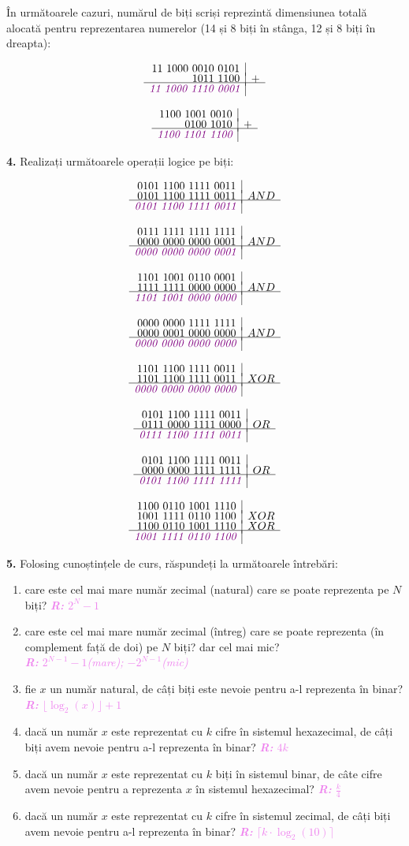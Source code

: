 \documentclass[a4paper]{article}
\newcommand{\hl}[1]{\textcolor{violet}{\textit{#1}}}
\newcommand{\binarysum}[3]{%
    \[
    \begin{array}{r|l}
    \text{#1} \\[-3pt]
    \text{#2} & + \\[-3pt]
    \hline
    \hl{#3} \\
    \end{array}
    \]
}
\newcommand{\binaryand}[3]{%
    \[
    \begin{array}{r|l}
    \text{#1} \\[-3pt]
    \text{#2} & AND \\[-3pt]
    \hline
    \hl{#3} \\
    \end{array}
    \]
}
\newcommand{\binaryor}[3]{%
    \[
    \begin{array}{r|l}
    \text{#1} \\[-3pt]
    \text{#2} & OR \\[-3pt]
    \hline
    \hl{#3} \\
    \end{array}
    \]
}
\newcommand{\binaryxor}[3]{%
    \[
    \begin{array}{r|l}
    \text{#1} \\[-3pt]
    \text{#2} & XOR \\[-3pt]
    \hline
    \hl{#3} \\
    \end{array}
    \]
}
\newcommand{\doublebinaryxor}[4]{%
    \begingroup\obeyspaces
    \[
    \begin{array}{r|l}
    \text{#1} \\[-3pt]
    \text{#2} & XOR \\[-3pt]
    \text{#3} & XOR \\[-3pt]
    \hline
    \hl{#4} \\
    \end{array}
    \]
    \endgroup
}
\begin{document}
În următoarele cazuri, numărul de biți scriși reprezintă dimensiunea totală alocată pentru reprezentarea numerelor (14 și 8 biți în stânga, 12 și 8 biți în dreapta):
\begin{multicols}{2}
\binarysum{11 1000 0010 0101}{1011 1100}{\hl{11 1000 1110 0001}}
\binarysum{1100 1001 0010}{0100 1010}{\hl{1100 1101 1100}}
\end{multicols}
\vspace{0.75cm}

\textbf{4.} Realizați următoarele operații logice pe biți:
\begin{multicols}{2}
\binaryand{0101 1100 1111 0011}{0101 1100 1111 0011}{\hl{0101 1100 1111 0011}}
\binaryand{0111 1111 1111 1111}{0000 0000 0000 0001}{\hl{0000 0000 0000 0001}}
\binaryand{1101 1001 0110 0001}{1111 1111 0000 0000}{\hl{1101 1001 0000 0000}}
\binaryand{0000 0000 1111 1111}{0000 0001 0000 0000}{\hl{0000 0000 0000 0000}}
\binaryxor{1101 1100 1111 0011}{1101 1100 1111 0011}{\hl{0000 0000 0000 0000}}
\binaryor{0101 1100 1111 0011}{0111 0000 1111 0000}{\hl{0111 1100 1111 0011}}
\binaryor{0101 1100 1111 0011}{0000 0000 1111 1111}{\hl{0101 1100 1111 1111}}
\doublebinaryxor{1100 0110 1001 1110}{1001 1111 0110 1100}{1100 0110 1001 1110}{1001 1111 0110 1100}
\end{multicols}
\vspace{0.75cm}

\textbf{5.} Folosing cunoștințele de curs, răspundeți la următoarele întrebări:
\begin{enumerate}[label=(\alph*)]
    \item care este cel mai mare număr zecimal (natural) care se poate reprezenta pe $N$ biți? \hl{\textbf{R:} $2^N - 1$}
    \item care este cel mai mare număr zecimal (întreg) care se poate reprezenta (în complement față de doi) pe $N$ biți? dar cel mai mic? \\ \hl{\textbf{R:} $2^{N-1} - 1$(mare); $-2^{N-1}$(mic)}
    \item fie $x$ un număr natural, de câți biți este nevoie pentru a-l reprezenta în binar? \hl{\textbf{R:} $\lfloor \log_2(x) \rfloor + 1$}
    \item dacă un număr $x$ este reprezentat cu $k$ cifre în sistemul hexazecimal, de câți biți avem nevoie pentru a-l reprezenta în binar? \hl{\textbf{R:} $4k$}
    \item dacă un număr $x$ este reprezentat cu $k$ biți în sistemul binar, de câte cifre avem nevoie pentru a reprezenta $x$ în sistemul hexazecimal? \hl{\textbf{R:} $\frac{k}{4}$}
    \item dacă un număr $x$ este reprezentat cu $k$ cifre în sistemul zecimal, de câți biți avem nevoie pentru a-l reprezenta în binar? \hl{\textbf{R:} $\lceil k \cdot \log_2(10) \rceil$}
\end{enumerate}
\vspace{0.75cm}
\end{document}
